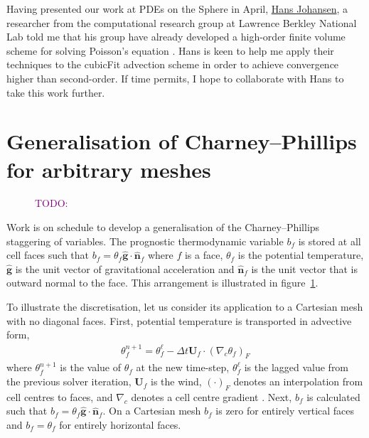 \documentclass[a4paper,11pt]{article}
\newcommand{\TODO}[1]{\textcolor{purple}{TODO: \emph{#1}}}
\begin{document}
Having presented our work at PDEs on the Sphere in April, \href{http://crd.lbl.gov/departments/applied-mathematics/ANAG/about/staff-and-postdocs/hans-johansen/}{Hans Johansen}, a researcher from the computational research group at Lawrence Berkley National Lab told me that his group have already developed a high-order finite volume scheme for solving Poisson's equation \citep{devendran2015}.  Hans is keen to help me apply their techniques to the cubicFit advection scheme in order to achieve convergence higher than second-order.  If time permits, I hope to collaborate with Hans to take this work further.

\section{Generalisation of Charney--Phillips for arbitrary meshes}

\begin{figure}
\centering
\caption{\TODO{}}
\label{fig:cp-staggering}
\end{figure}

Work is on schedule to develop a generalisation of the Charney--Phillips staggering of variables.  The prognostic thermodynamic variable $b_f$ is stored at all cell faces such that $b_f = \theta_f \mathbf{\hat{g}} \cdot \mathbf{\hat{n}}_f$ where $f$ is a face, $\theta_f$ is the potential temperature, $\mathbf{\hat{g}}$ is the unit vector of gravitational acceleration and $\mathbf{\hat{n}}_f$ is the unit vector that is outward normal to the face.
This arrangement is illustrated in figure~\ref{fig:cp-staggering}.

To illustrate the discretisation, let us consider its application to a Cartesian mesh with no diagonal faces.  First, potential temperature is transported in advective form,
\begin{align*}
	\theta_f^{n+1} = \theta_f^{\ell} - \Delta t \mathbf{U}_f \cdot \left( \nabla_c \theta_f \right)_F
\end{align*}
where $\theta_f^{n+1}$ is the value of $\theta_f$ at the new time-step, $\theta_f^\ell$ is the lagged value from the previous solver iteration, $\mathbf{U}_f$ is the wind, $\left( \cdot \right)_F$ denotes an interpolation from cell centres to faces, and $\nabla_c$ denotes a cell centre gradient \citep{weller-shahrokhi2014}.
Next, $b_f$ is calculated such that $b_f = \theta_f \mathbf{\hat{g}} \cdot \mathbf{\hat{n}}_f$.  
On a Cartesian mesh $b_f$ is zero for entirely vertical faces and $b_f = \theta_f$ for entirely horizontal faces.
\end{document}
